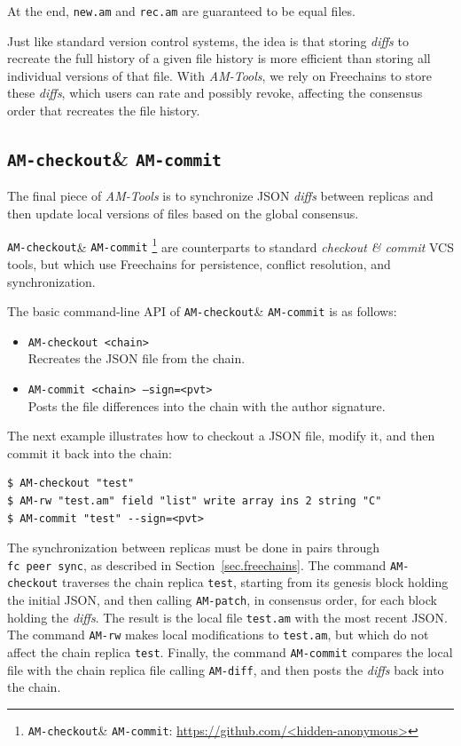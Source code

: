 \documentclass[12pt]{article}
\newcommand{\AMT}      {\emph{AM-Tools}\xspace}
\newcommand{\code}[1]  {\texttt{\footnotesize{#1}}}
\newcommand{\amrw}       {\code{AM-rw}\xspace}
\newcommand{\amdiff}     {\code{AM-diff}\xspace}
\newcommand{\ampatch}    {\code{AM-patch}\xspace}
\newcommand{\amcheckout} {\code{AM-checkout}\xspace}
\newcommand{\amcommit}   {\code{AM-commit}\xspace}
\begin{document}
At the end, \code{new.am} and \code{rec.am} are guaranteed to be equal files.

Just like standard version control systems, the idea is that storing
\emph{diffs} to recreate the full history of a given file history is more
efficient than storing all individual versions of that file.
%
With \AMT, we rely on Freechains to store these \emph{diffs}, which users can
rate and possibly revoke, affecting the consensus order that recreates the file
history.

\subsection{\amcheckout \& \amcommit}

The final piece of \AMT is to synchronize JSON \emph{diffs} between replicas
and then update local versions of files based on the global consensus.

\amcheckout \& \amcommit%
    \footnote{\amcheckout \& \amcommit: \url{https://github.com/<hidden-anonymous>}}
are counterparts to standard \emph{checkout \& commit} VCS tools, but which use
Freechains for persistence, conflict resolution, and synchronization.

The basic command-line API of \amcheckout \& \amcommit is as follows:

\begin{itemize}
\item \code{AM-checkout <chain>} \\
    Recreates the JSON file from the chain.
\item \code{AM-commit <chain> --sign=<pvt>} \\
    Posts the file differences into the chain with the author signature.
\end{itemize}

The next example illustrates how to checkout a JSON file, modify it, and then
commit it back into the chain:

{\footnotesize
\begin{verbatim}
$ AM-checkout "test"
$ AM-rw "test.am" field "list" write array ins 2 string "C"
$ AM-commit "test" --sign=<pvt>
\end{verbatim}
}

The synchronization between replicas must be done in pairs through
\code{fc~peer~sync}, as described in Section~\ref{sec.freechains}.
%
The command \amcheckout traverses the chain replica \code{test}, starting from
its genesis block holding the initial JSON, and then calling \ampatch, in
consensus order, for each block holding the \emph{diffs}.
The result is the local file \code{test.am} with the most recent JSON.
%
The command \amrw makes local modifications to \code{test.am}, but which do not
affect the chain replica \code{test}.
%
Finally, the command \amcommit compares the local file with the chain replica
file calling \amdiff, and then posts the \emph{diffs} back into the chain.
\end{document}
